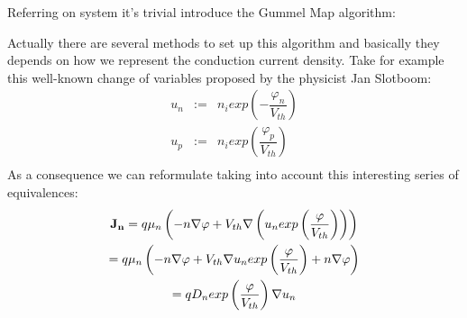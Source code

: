 Referring on system  it's trivial introduce the Gummel Map algorithm:

Actually there are several methods to set up this algorithm and basically they depends on how we represent the conduction current density. Take for example this well-known change of variables proposed by the physicist Jan Slotboom:
\begin{equation}
\label{eq: slotboom formulas}
\begin{array}{rcl}
u_n & := & n_i exp\left(-\dfrac{\varphi_n}{V_{th}} \right)\\
u_p & := & n_i exp\left(\dfrac{\varphi_p}{V_{th}} \right) \\
\end{array}
\end{equation}
As a consequence we can reformulate  taking into account this interesting series of equivalences:
\begin{multline*}
\footnotesize
\mathbf{J_n}=
q\mu_n \left( - n \nabla \varphi + V_{th} \nabla \left( u_n exp\left(\dfrac{\varphi}{V_{th}} \right) \right) \right) \\ = 
q \mu_n \left(  -n \nabla \varphi + V_{th}\nabla u_n exp\left(\dfrac{\varphi}{V_{th}} \right) + n \nabla \varphi \right) \\ =
q D_n exp\left(\dfrac{\varphi}{V_{th}} \right) \nabla u_n 
\end{multline*}

